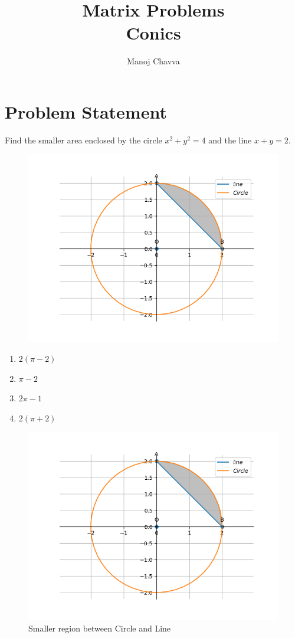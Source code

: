 \documentclass[journal,12pt,twocolumn]{IEEEtran}
\title{Matrix Problems \textbf{\\Conics }}
\author{Manoj Chavva}
\begin{document}
\maketitle
\section{Problem Statement}

\noindent 
\fi
Find the smaller area enclosed by the circle $x^2 + y^2 = 4$ and the line $x + y = 2$. 
\\
\solution
	\begin{figure}[!h]
		\centering
 \includegraphics[width=\columnwidth]{chapters/12/8/2/6/figs/conic.png}
		\caption{}
		\label{fig:12/8/2/6}
  	\end{figure}
\iffalse
\begin{enumerate}
\item $2(\pi -2)$
\item $\pi -2$
\item $2\pi -1$
\item $2(\pi +2)$
\end{enumerate}


\begin{figure}[h]
\includegraphics[width=1\columnwidth]{./figs/conic.png}
\caption{Smaller region between Circle and Line}
\label{fig:conic}
\end{figure}
\end{document}
